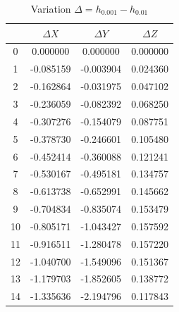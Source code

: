 \documentclass[12pt, a4paper]{article}
\begin{document}
	\begin{table}[H]
		\centering
		\footnotesize %
		\begin{tabular}{|c|c|c|c|}
			\toprule
			   & $\Delta X$ & $\Delta Y$ & $\Delta Z$ \\
			\midrule
			0  & 0.000000   & 0.000000   & 0.000000   \\
			1  & -0.085159  & -0.003904  & 0.024360   \\
			2  & -0.162864  & -0.031975  & 0.047102   \\
			3  & -0.236059  & -0.082392  & 0.068250   \\
			4  & -0.307276  & -0.154079  & 0.087751   \\
			5  & -0.378730  & -0.246601  & 0.105480   \\
			6  & -0.452414  & -0.360088  & 0.121241   \\
			7  & -0.530167  & -0.495181  & 0.134757   \\
			8  & -0.613738  & -0.652991  & 0.145662   \\
			9  & -0.704834  & -0.835074  & 0.153479   \\
			10 & -0.805171  & -1.043427  & 0.157592   \\
			11 & -0.916511  & -1.280478  & 0.157220   \\
			12 & -1.040700  & -1.549096  & 0.151367   \\
			13 & -1.179703  & -1.852605  & 0.138772   \\
			14 & -1.335636  & -2.194796  & 0.117843   \\
			\bottomrule
		\end{tabular}
		\caption{Variation $\Delta = h_{0.001} - h_{0.01}$}
	\end{table}
	    
\end{document}
